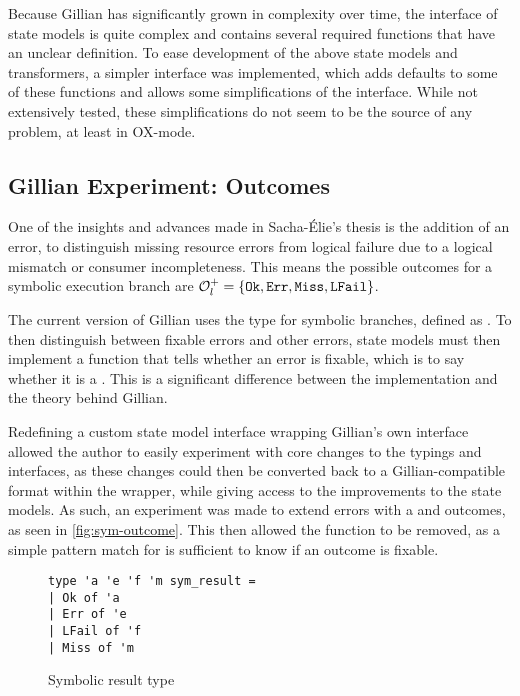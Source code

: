 Because Gillian has significantly grown in complexity over time, the interface of state models  is quite complex and contains several required functions that have an unclear definition. To ease development of the above state models and transformers, a simpler interface  was implemented, which adds defaults to some of these functions and allows some simplifications of the interface. While not extensively tested, these simplifications do not seem to be the source of any problem, at least in OX-mode.

\subsection{Gillian Experiment: Outcomes}

One of the insights and advances made in Sacha-Élie's thesis is the addition of an \LFail{} error, to distinguish missing resource errors from logical failure due to a logical mismatch or consumer incompleteness. This means the possible outcomes for a symbolic execution branch are ${\cal O}_l^+ = \{\texttt{Ok},\texttt{Err}, \texttt{Miss}, \texttt{LFail}\}$.

The current version of Gillian uses the  type for symbolic branches, defined as . To then distinguish between fixable \Miss{} errors and other errors, state models must then implement a  function that tells whether an error is fixable, which is to say whether it is a \Miss. This is a significant difference between the implementation and the theory behind Gillian.

Redefining a custom state model interface wrapping Gillian's own interface allowed the author to easily experiment with core changes to the typings and interfaces, as these changes could then be converted back to a Gillian-compatible format within the wrapper, while giving access to the improvements to the state models. As such, an experiment was made to extend errors with a \Miss{} and \LFail{} outcomes, as seen in \autoref{fig:sym-outcome}. This then allowed the  function to be removed, as a simple pattern match for \Miss{} is sufficient to know if an outcome is fixable.

\begin{figure}[h]
\centering
\begin{lstlisting}
type 'a 'e 'f 'm sym_result =
| Ok of 'a
| Err of 'e
| LFail of 'f
| Miss of 'm
\end{lstlisting}
\caption{Symbolic result type}
\label{fig:sym-outcome}
\end{figure}

